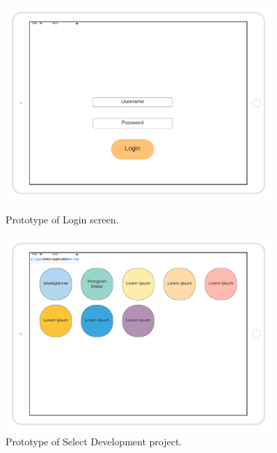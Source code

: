 \begin{figure}[H]
    \centering
    \begin{minipage}{0.45\textwidth}
        \centering
        \includegraphics[width=0.9\textwidth]{images/Login-Mockup.png}
        \caption{Prototype of Login screen.}
    \end{minipage}\hfill
    \begin{minipage}{0.45\textwidth}
        \centering
        \includegraphics[width=0.9\textwidth]{images/Select-App-Mockup.png}
        \caption{Prototype of Select Development project.}
    \end{minipage}
\end{figure}

